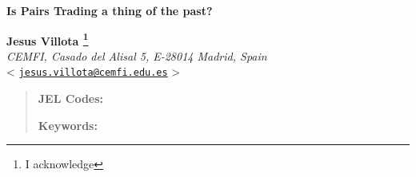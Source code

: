 \documentclass[12pt,a4paper]{article}
\begin{document}
\begin{center}
{\Large \textbf{
Is Pairs Trading a thing of the past?
}}

\vspace{3cm}

{\large \textbf{Jesus Villota
\footnote{I acknowledge}
}}\\
\textit{CEMFI, Casado del Alisal 5, E-28014 Madrid, Spain}\\
<
\href{mailto:jesus.villota@cemfi.edu.es}{\texttt{jesus.villota@cemfi.edu.es}}
>

\vspace{2cm}


\end{center}

\thispagestyle{empty}

\begin{abstract}
%
\noindent\textbf{JEL Codes:} 

\noindent\textbf{Keywords:} 
\end{abstract}

\newpage
\setcounter{page}{1}




%

%



%





%
\end{document}
